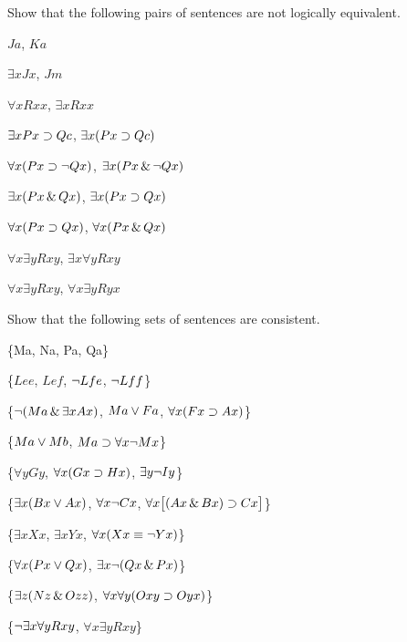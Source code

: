 \solutions
\problempart
\label{pr.NotEquiv}
Show that the following pairs of sentences are not logically equivalent.
\begin{earg}
\item $Ja$, $Ka$
\item $\exists x Jx$, $Jm$
\item $\forall x Rxx$, $\exists x Rxx$
\item $\exists x Px \supset Qc$, $\exists x (Px \supset Qc)$
\item $\forall x(Px \supset \neg Qx)$, $\exists x(Px \,\&\, \neg Qx)$
\item $\exists x(Px \,\&\, Qx)$, $\exists x(Px \supset Qx)$
\item $\forall x(Px\supset Qx)$, $\forall x(Px \,\&\, Qx)$
\item $\forall x\exists y Rxy$, $\exists x\forall y Rxy$
\item $\forall x\exists y Rxy$, $\forall x\exists y Ryx$
\end{earg}



\problempart
Show that the following sets of sentences are consistent.
\begin{earg}
\item \{Ma, \enot Na, Pa, \enot Qa\}
\item \{$Lee$, $Lef$, $\neg Lfe$, $\neg Lff$\}
\item \{$\neg (Ma \,\&\, \exists x Ax)$, $Ma \vee Fa$, $\forall x(Fx \supset Ax)$\}
\item \{$Ma \vee Mb$, $Ma \supset \forall x \neg Mx$\}
\item \{$\forall y Gy$, $\forall x (Gx \supset Hx)$, $\exists y \neg Iy$\}
\item \{$\exists x(Bx \vee Ax)$, $\forall x \neg Cx$, $\forall x\bigl[(Ax \,\&\, Bx) \supset Cx\bigr]$\}
\item \{$\exists x Xx$, $\exists x Yx$, $\forall x(Xx \equiv \neg Yx)$\}
\item \{$\forall x(Px \vee Qx)$, $\exists x\neg(Qx \,\&\, Px)$\}
\item \{$\exists z(Nz \,\&\, Ozz)$, $\forall x\forall y(Oxy \supset Oyx)$\}
\item \{$\neg \exists x \forall y Rxy$, $\forall x \exists y Rxy$\}
\end{earg}


